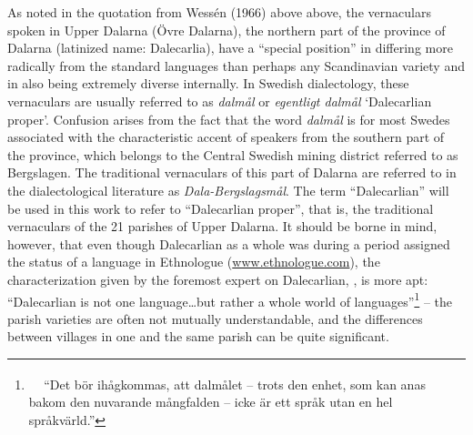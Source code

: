 \begin{styleBodyTextFirst}
As noted in the quotation from Wessén (1966) above above, the vernaculars spoken in Upper Dalarna (Övre Dalarna), the northern part of the province of Dalarna (latinized name: Dalecarlia), have a “special position” in differing more radically from the standard languages than perhaps any Scandinavian variety and in also being extremely diverse internally. In Swedish dialectology, these vernaculars are usually referred to as \textit{dalmål} or \textit{egentligt dalmål }‘Dalecarlian proper’. Confusion arises from the fact that the word \textit{dalmål} is for most Swedes associated with the characteristic accent of speakers from the southern part of the province, which belongs to the Central Swedish mining district referred to as Bergslagen. The traditional vernaculars of this part of Dalarna are referred to in the dialectological literature as \textit{Dala-Bergslagsmål}. The term “Dalecarlian” will be used in this work to refer to “Dalecarlian proper”, that is, the traditional vernaculars of the 21 parishes of Upper Dalarna. It should be borne in mind, however, that even though Dalecarlian as a whole was during a period  assigned the status of a language in Ethnologue (\href{http://www.ethnologue.com/}{www.ethnologue.com}), the characterization given by the foremost expert on Dalecarlian, \citet[257]{Levander1928}, is more apt: “Dalecarlian is not one language…but rather a whole world of languages”\footnote{\textsuperscript{\ \ }\textsuperscript{ }“Det bör ihågkommas, att dalmålet – trots den enhet, som kan anas bakom den nuvarande mångfalden – icke är ett språk utan en hel språkvärld.”} – the parish varieties are often not mutually understandable, and the differences between villages in one and the same parish can be quite significant. 

\end{styleBodyTextFirst}


